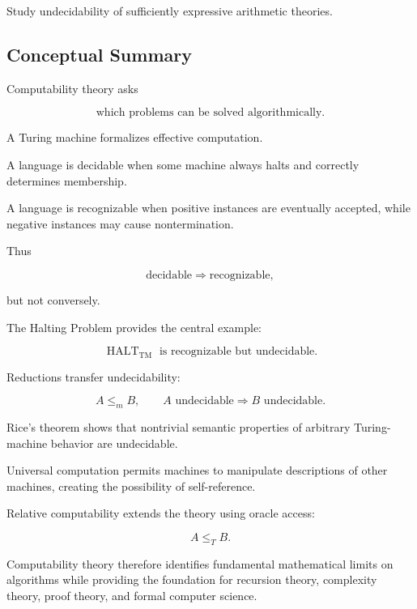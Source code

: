\begin{exercise}[4]
Study undecidability of sufficiently expressive arithmetic theories.
\end{exercise}

\subsection{Conceptual Summary}
\label{subsec:computability-summary}

Computability theory asks

\[
\boxed{
\text{which problems can be solved algorithmically}.
}
\]

A Turing machine formalizes effective computation.

A language is decidable when some machine always halts and correctly
determines membership.

A language is recognizable when positive instances are eventually
accepted, while negative instances may cause nontermination.

Thus

\[
\boxed{
\text{decidable}
\Longrightarrow
\text{recognizable},
}
\]

but not conversely.

The Halting Problem provides the central example:

\[
\boxed{
\operatorname{HALT}_{\mathrm{TM}}
\text{ is recognizable but undecidable}.
}
\]

Reductions transfer undecidability:

\[
\boxed{
A\leq_mB,
\qquad
A
\text{ undecidable}
\Longrightarrow
B
\text{ undecidable}.
}
\]

Rice's theorem shows that nontrivial semantic properties of arbitrary
Turing-machine behavior are undecidable.

Universal computation permits machines to manipulate descriptions of other
machines, creating the possibility of self-reference.

Relative computability extends the theory using oracle access:

\[
\boxed{
A\leq_TB.
}
\]

Computability theory therefore identifies fundamental mathematical limits
on algorithms while providing the foundation for recursion theory,
complexity theory, proof theory, and formal computer science.

